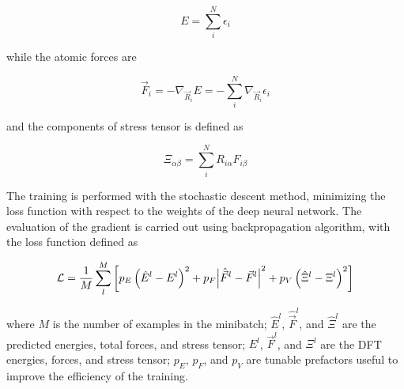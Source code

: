 \begin{equation}
    E = \sum_i^N	\epsilon_i
\end{equation}

while the atomic forces are

\begin{equation}
    \vec{F}_i = - \nabla_{\vec{R}_i} E = - \sum_i^N \nabla_{\vec{R}_i}
    \epsilon_i
\end{equation}

and the components of stress tensor is defined as

\begin{equation}
    \Xi_{\alpha \beta} = \sum_i^N R_{i\alpha} F_{i\beta}
\end{equation}

The training is performed with the stochastic descent method, minimizing the
loss function with respect to the weights of the deep neural network. The
evaluation of the gradient is carried out using backpropagation algorithm,
with the loss function defined as

\begin{equation}
    \mathcal{L} =   \frac{1}{M} \sum_l^M  \left[  p_E \left(\hat{E}^l- E^l
        \right)^2 +
        p_F \abs{\hat{\vec{F}}^l- \vec{F}^l}^2 + p_V \left(\hat{\Xi}^l- \Xi^l
        \right)^2 \right]
\end{equation}

where $M$ is the number of examples in the minibatch; $\hat{E}^l$,
$\hat{\vec{F}}^l$, and $\hat{\Xi}^l$
are the predicted energies, total forces, and stress tensor; $E^l$,
$\vec{F}^l$, and $\Xi^l$ are
the DFT
energies, forces, and stress tensor; $p_E$, $p_F$, and $p_V$  are tunable
prefactors
useful to improve the
efficiency of the training.